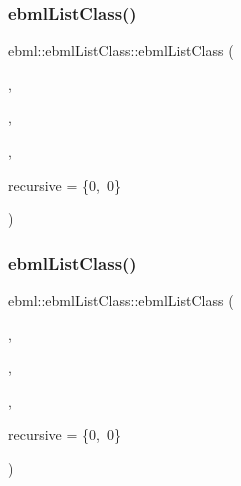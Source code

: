 \mbox{\label{classebml_1_1ebmlListClass_afc3e7e9c4a9f663044a77793c20d67ca}} 
\subsubsection{\texorpdfstring{ebml\+List\+Class()}{ebmlListClass()}\hspace{0.1cm}{\footnotesize\ttfamily [2/6]}}
{\footnotesize\ttfamily ebml\+::ebml\+List\+Class\+::ebml\+List\+Class (\begin{DoxyParamCaption}\item[{const char $\ast$}]{,  }\item[{const std\+::wstring \&}]{,  }\item[{const \mbox{\hyperlink{namespaceebml_abf07998998c284c9be3f76b5d9e192e1}{child\+Class\+Spec\+Arg\+\_\+l}} \&}]{,  }\item[{const \mbox{\hyperlink{structebml_1_1occurSpec__t}{occur\+Spec\+\_\+t}} \&}]{recursive = {\ttfamily \{0,~0\}} }\end{DoxyParamCaption})}

\mbox{\label{classebml_1_1ebmlListClass_a8a53119a28cbc5a56b16d3ddc0822116}} 
\subsubsection{\texorpdfstring{ebml\+List\+Class()}{ebmlListClass()}\hspace{0.1cm}{\footnotesize\ttfamily [3/6]}}
{\footnotesize\ttfamily ebml\+::ebml\+List\+Class\+::ebml\+List\+Class (\begin{DoxyParamCaption}\item[{const char $\ast$}]{,  }\item[{const std\+::wstring \&}]{,  }\item[{\mbox{\hyperlink{namespaceebml_a40cf7ad4b58caaa8c07da3ed83f7a431}{child\+Class\+Spec\+Arg\+\_\+init\+\_\+l}}}]{,  }\item[{const \mbox{\hyperlink{structebml_1_1occurSpec__t}{occur\+Spec\+\_\+t}} \&}]{recursive = {\ttfamily \{0,~0\}} }\end{DoxyParamCaption})}

